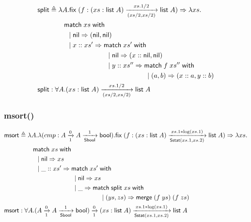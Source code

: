\documentclass{article}
\newcommand{\arrow}[4]{#1\xrightarrow[#3]{#2}#4}
\newcommand{\symmatch}{\mathsf{match}}
\newcommand{\symwith}{\mathsf{\;with\;}}
\newcommand{\symlist}{\mathsf{list}}
\newcommand{\symnil}{\mathsf{nil}}
\newcommand{\symfix}{\mathsf{fix}}
\newcommand{\symbool}{\mathsf{bool}}
\newcommand{\symmerge}{\mathsf{merge}}
\newcommand{\intro}[2]{(#1 : #2)}
\newcommand{\symSbool}{\mathsf{Sbool}}
\newcommand{\symmsort}{\mathsf{msort}}
\newcommand{\symSstat}{\mathsf{Sstat}}
\newcommand{\symsplit}{\mathsf{split}}
\newcommand{\defeq}{\triangleq}
\begin{document}
\begin{align*}
\symsplit &\defeq \lambda A. \symfix\;(f:\arrow{\intro{xs}{\symlist\;A}}{xs.1/2}{(xs/2,xs/2)}{\symlist\;A})\Rightarrow\lambda xs. \\
& \hspace{0.3in} \symmatch\;xs\symwith \\
& \hspace{.4in} |\; \symnil\Rightarrow (\symnil,\symnil) \\
& \hspace{.4in} |\; x::xs' \Rightarrow \symmatch\;xs'\symwith \\
& \hspace{1.2in} |\; \symnil\Rightarrow (x::\symnil,\symnil) \\
& \hspace{1.2in} |\; y::xs'' \Rightarrow \symmatch\; f\;xs'' \symwith \\
& \hspace{2in} |\; (a, b) \Rightarrow (x::a,y::b) \\
\symsplit &: \forall A.\arrow{\intro{xs}{\symlist\;A}}{xs.1/2}{(xs/2,xs/2)}{\symlist\;A}
\end{align*}

\subsubsection{msort()}

\begin{align*}
\symmsort &\defeq \lambda A. \lambda (cmp:\arrow{A}{0}{1}{\arrow{A}{1}{\symSbool}{\symbool}}).\symfix\;(f:\arrow{\intro{xs}{\symlist\;A}}{xs.1*\log(xs.1)}{\symSstat(xs.1,xs.2)}{\symlist\;A})\Rightarrow\lambda xs. \\
& \hspace{0.3in} \symmatch\;xs\symwith \\
& \hspace{.4in} |\; \symnil\Rightarrow xs \\
& \hspace{.4in} |\; \_::xs' \Rightarrow \symmatch\;xs'\symwith \\
& \hspace{1.2in} |\; \symnil\Rightarrow xs \\
& \hspace{1.2in} |\; \_ \Rightarrow \symmatch\; \symsplit\;xs \symwith \\
& \hspace{1.8in} |\; (ys, zs) \Rightarrow \symmerge\;(f\;ys)\;(f\;zs) \\
\symmsort &: \forall A.\arrow{(\arrow{A}{0}{1}{\arrow{A}{1}{\symSbool}{\symbool}})}{0}{1}{\arrow{\intro{xs}{\symlist\;A}}{xs.1*\log(xs.1)}{\symSstat(xs.1,xs.2)}{\symlist\;A}}
\end{align*}
\end{document}
